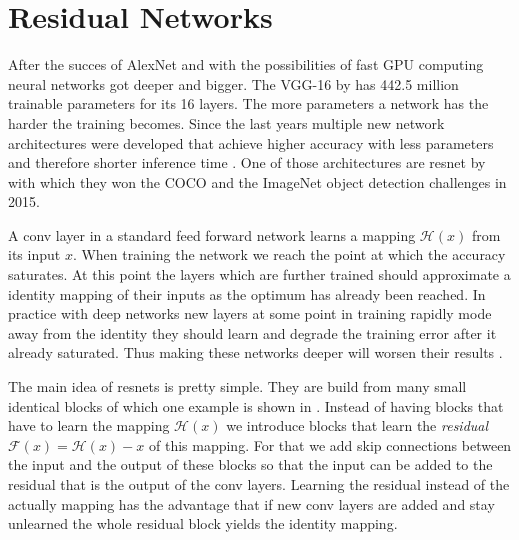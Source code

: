 \section{Residual Networks}
\label{sec:concepts:resnet}
After the succes of AlexNet \citep{krizhevsky_imagenet_2012} and with the possibilities of fast GPU computing neural networks got deeper and bigger.
The VGG-16 by \citet{simonyan_very_2014} has 442.5 million trainable parameters for its 16 layers. The more parameters a network has the harder the training becomes.
Since the last years multiple new network architectures were developed that achieve higher accuracy with less parameters and therefore shorter inference time \citep{canziani_analysis_2016}. One of those architectures are \gls{resnet} by \citet{he_deep_2016} with which they won the COCO  \citep{lin_microsoft_2014} and the ImageNet \citep{russakovsky_imagenet_2014} object detection challenges in 2015.

A \gls{conv} layer in a standard feed forward network learns a mapping $\mathcal{H}(x)$ from its input $x$. When training the network we reach the point at which the accuracy saturates. At this point the layers which are further trained should approximate a identity mapping of their inputs as the optimum has already been reached. In practice with deep networks new layers at some point in training rapidly mode away from the identity they should learn and degrade the training error after it already saturated. Thus making these networks deeper will worsen their results \citep{he_convolutional_2015}.

The main idea of \glspl{resnet} is pretty simple. They are build from many small identical blocks of which one example is shown in . Instead of having blocks that have to learn the mapping $\mathcal{H}(x)$ we introduce blocks that learn the \textit{residual} $\mathcal{F}(x) = \mathcal{H}(x) - x$ of this mapping. For that we add skip connections between the input and the output of these blocks so that the input can be added to the residual that is the output of the \gls{conv} layers. Learning the residual instead of the actually mapping has the advantage that if new \gls{conv} layers are added and stay unlearned the whole residual block yields the identity mapping.

\begin{figure}
    \centering
    \caption{}
    \label{fig:resblock}
\end{figure}
